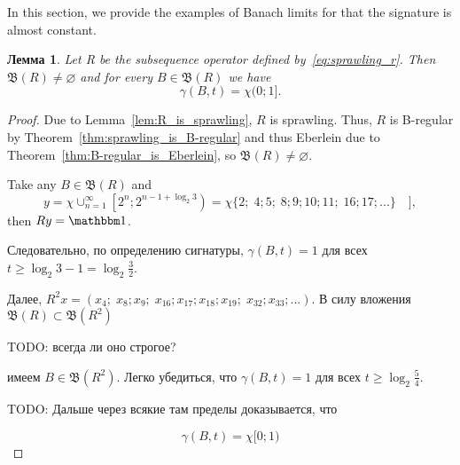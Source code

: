 \documentclass[a4paper,14pt]{article} %
\newcommand{\B}{\ensuremath{\mathfrak{B}}}
\newcommand{\one}{\ensuremath{\mathbbm 1}}
\theoremstyle{plain}
\newtheorem{lemma}{Лемма}[section]
\newtheorem{theorem}[lemma]{Теорема}
\begin{document}
In this section, we provide the examples of Banach limits for that the signature is almost constant.

\begin{lemma}
	Let R be the subsequence operator
	defined by~\eqref{eq:sprawling_r}.
	Then $\B(R) \ne\varnothing$ and for every $B\in \B(R)$ we have
	\begin{equation}
		\gamma(B, t) = \chi(0;1]
		.
	\end{equation}
\end{lemma}

\begin{proof}
	Due to Lemma~\ref{lem:R_is_sprawling}, $R$ is sprawling.
	Thus, $R$ is B-regular by Theorem~\ref{thm:sprawling_is_B-regular} and thus Eberlein due to Theorem~\ref{thm:B-regular_is_Eberlein},
	so $\B(R)\ne \varnothing$.

	Take any $B \in \mathfrak{B}(R)$ and
	\begin{equation}
		y = \chi \cup_{n=1}^\infty \left[ 2^n; 2^{n-1+\log_2 3}\right) =
		\chi \{ 2; \; 4;5; \; 8;9;10;11; \; 16;17;... \}\quad]
		,
	\end{equation}
	then $Ry=\one$.

	Следовательно, по определению сигнатуры, $\gamma(B,t) = 1$ для всех $t \geq \log_2 3 - 1 = \log_2 \frac32$.

	Далее, $R^2 x = (x_4; \; x_8; x_9;\; x_{16}; x_{17}; x_{18}; x_{19}; \; x_{32}; x_{33};...)$.
	В силу вложения $\mathfrak{B}(R)\subset\mathfrak{B}(R^2)$

	TODO: всегда ли оно строгое?

	имеем $B\in\mathfrak{B}(R^2)$.
	Легко убедиться, что $\gamma(B,t) = 1$ для всех $t \geq \log_2 \frac54$.

	TODO: Дальше через всякие там пределы доказывается, что

	\begin{equation}
		\label{eq:gamma_chi_0_1}
		\gamma(B,t) = \chi{[}0;1)
	\end{equation}





\end{proof}

\end{document}
